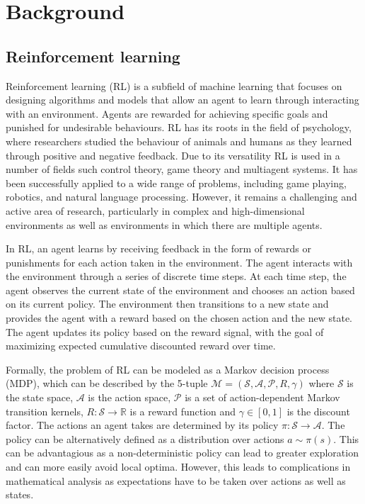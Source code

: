 \chapter{Background}

\section{Reinforcement learning}
\label{sec:RL}
Reinforcement learning (RL) is a subfield of machine learning that focuses on designing algorithms and models that allow an agent to learn through interacting with an environment. Agents are rewarded for achieving specific goals and punished for undesirable behaviours. RL has its roots in the field of psychology, where researchers studied the behaviour of animals and humans as they learned through positive and negative feedback. Due to its versatility RL is used in a number of fields such control theory, game theory and multiagent systems. It has been successfully applied to a wide range of problems, including game playing, robotics, and natural language processing. However, it remains a challenging and active area of research, particularly in complex and high-dimensional environments as well as environments in which there are multiple agents. 

In RL, an agent learns by receiving feedback in the form of rewards or punishments for each action taken in the environment. The agent interacts with the environment through a series of discrete time steps. At each time step, the agent observes the current state of the environment and chooses an action based on its current policy. The environment then transitions to a new state and provides the agent with a reward based on the chosen action and the new state. The agent updates its policy based on the reward signal, with the goal of maximizing expected cumulative discounted reward over time.

Formally, the problem of RL can be modeled as a Markov decision process (MDP), which can be described by the 5-tuple $\mathcal{M} = (\mathcal{S}, \mathcal{A}, \mathcal{P}, R,\gamma)$ where $\mathcal{S}$ is the state space, $\mathcal{A}$ is the action space, $\mathcal{P}$ is a set of action-dependent Markov transition kernels, $R: \mathcal{S} \rightarrow \mathbb{R}$ is a reward function and $\gamma \in [0,1]$ is the discount factor.
The actions an agent takes are determined by its policy $\pi: \mathcal{S} \rightarrow \mathcal{A}$. The policy can be alternatively defined as a distribution over actions $a \sim \pi(s)$. This can be advantagious as a non-deterministic policy can lead to greater exploration and can more easily avoid local optima. However, this leads to complications in mathematical analysis as expectations have to be taken over actions as well as states.

